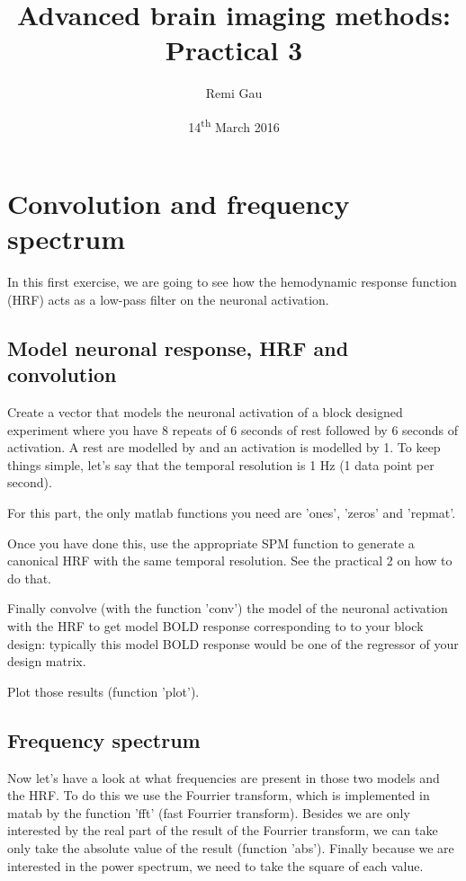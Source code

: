 \documentclass[a4paper,10pt]{article}
\title{Advanced brain imaging methods: Practical 3}
\author{Remi Gau}
\date{14\textsuperscript{th} March 2016}
\begin{document}
\maketitle

\bigskip
\section{Convolution and frequency spectrum}

In this first exercise, we are going to see how the hemodynamic response function (HRF) acts as a low-pass filter on the neuronal activation.


\subsection{Model neuronal response, HRF and convolution}

Create a vector that models the neuronal activation of a block designed experiment where you have 8 repeats of 6 seconds of rest followed by 6 seconds of activation. A rest are modelled by and an activation is modelled by 1. To keep things simple, let's say that the temporal resolution is 1 Hz (1 data point per second).

For this part, the only matlab functions you need are 'ones', 'zeros' and 'repmat'.

Once you have done this, use the appropriate SPM function to generate a canonical HRF with the same temporal resolution. See the practical 2 on how to do that.

Finally convolve (with the function 'conv') the model of the neuronal activation with the HRF to get model BOLD response corresponding to to your block design: typically this model BOLD response would be one of the regressor of your design matrix.

Plot those results (function 'plot').


\subsection{Frequency spectrum}

Now let's have a look at what frequencies are present in those two models and the HRF. To do this we use the Fourrier transform, which is implemented in matab by the function 'fft' (fast Fourrier transform). Besides we are only interested by the real part of the result of the Fourrier transform, we can take only take the absolute value of the result (function 'abs'). Finally because we are interested in the power spectrum, we need to take the square of each value.
\end{document}
